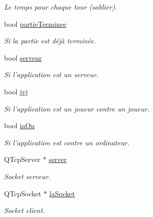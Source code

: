 \begin{DoxyCompactItemize}
\begin{DoxyCompactList}\small\item\em Le temps pour chaque tour (sablier). \end{DoxyCompactList}\item 
bool \hyperlink{class_main_window_a00d26707b5d27cc6ce07479a46244692}{partie\-Terminee}
\begin{DoxyCompactList}\small\item\em Si la partie est déjà terminée. \end{DoxyCompactList}\item 
bool \hyperlink{class_main_window_ac4fe06d6d85536567fd86733f8cdf6c9}{serveur}
\begin{DoxyCompactList}\small\item\em Si l'application est un serveur. \end{DoxyCompactList}\item 
bool \hyperlink{class_main_window_a8037ff2bca42ebb5858b0cebd5ef9bb7}{jvj}
\begin{DoxyCompactList}\small\item\em Si l'application est un joueur contre un joueur. \end{DoxyCompactList}\item 
bool \hyperlink{class_main_window_a68723ed09b653ede2bd97dd85928076b}{ia\-On}
\begin{DoxyCompactList}\small\item\em Si l'application est contre un ordinateur. \end{DoxyCompactList}\item 
\hypertarget{class_main_window_a4b1e890b4b33f6ff8c22621d2ce55c2d}{Q\-Tcp\-Server $\ast$ \hyperlink{class_main_window_a4b1e890b4b33f6ff8c22621d2ce55c2d}{server}}\label{class_main_window_a4b1e890b4b33f6ff8c22621d2ce55c2d}

\begin{DoxyCompactList}\small\item\em Socket serveur. \end{DoxyCompactList}\item 
\hypertarget{class_main_window_af1832d65e85d46eb6cd8492cbec60864}{Q\-Tcp\-Socket $\ast$ \hyperlink{class_main_window_af1832d65e85d46eb6cd8492cbec60864}{la\-Socket}}\label{class_main_window_af1832d65e85d46eb6cd8492cbec60864}

\begin{DoxyCompactList}\small\item\em Socket client. \end{DoxyCompactList}\end{DoxyCompactItemize}


